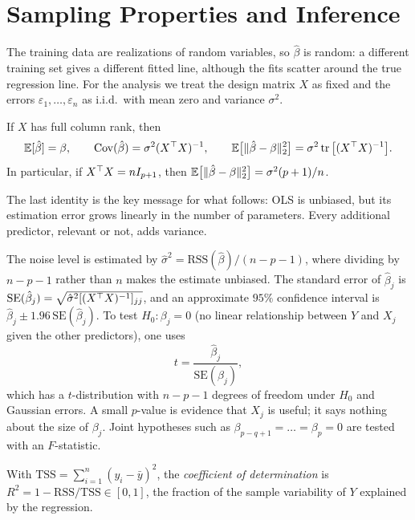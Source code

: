 \section{Sampling Properties and Inference}\label{sec:ols-inference}

The training data are realizations of random variables, so $\hat\beta$ is random: a different training set gives a different fitted line, although the fits scatter around the true regression line. For the analysis we treat the design matrix $X$ as fixed and the errors $\varepsilon_1,\dots,\varepsilon_n$ as i.i.d.\ with mean zero and variance $\sigma^2$.

\begin{proposition}\label{prop:ols-moments}
If $X$ has full column rank, then
\[
\mathbb{E}[\hat\beta]=\beta,\qquad \operatorname{Cov}(\hat\beta)=\sigma^2(X^{\top} X)^{-1},\qquad \mathbb{E}\big[\lVert \hat\beta-\beta\rVert_2^2\big]=\sigma^2\operatorname{tr}\big[(X^{\top} X)^{-1}\big].
\]
In particular, if $X^{\top} X=nI_{p+1}$, then $\mathbb{E}\big[\lVert \hat\beta-\beta\rVert_2^2\big]=\sigma^2(p+1)/n$.
\end{proposition}

The last identity is the key message for what follows: OLS is unbiased, but its estimation error grows linearly in the number of parameters. Every additional predictor, relevant or not, adds variance.

The noise level is estimated by $\hat\sigma^2=\mathrm{RSS}(\hat\beta)/(n-p-1)$, where dividing by $n-p-1$ rather than $n$ makes the estimate unbiased. The standard error of $\hat\beta_j$ is $\mathrm{SE}(\hat\beta_j)=\sqrt{\hat\sigma^2[(X^{\top} X)^{-1}]_{jj}}$, and an approximate $95\%$ confidence interval is $\hat\beta_j\pm1.96\,\mathrm{SE}(\hat\beta_j)$. To test $H_0\colon\beta_j=0$ (no linear relationship between $Y$ and $X_j$ given the other predictors), one uses
\[
t=\frac{\hat\beta_j}{\mathrm{SE}(\hat\beta_j)},
\]
which has a $t$-distribution with $n-p-1$ degrees of freedom under $H_0$ and Gaussian errors. A small $p$-value is evidence that $X_j$ is useful; it says nothing about the size of $\beta_j$. Joint hypotheses such as $\beta_{p-q+1}=\dots=\beta_p=0$ are tested with an $F$-statistic.

\begin{definition}\label{def:r2}
With $\mathrm{TSS}=\sum_{i=1}^n(y_i-\bar y)^2$, the \emph{coefficient of determination} is $R^2=1-\mathrm{RSS}/\mathrm{TSS}\in[0,1]$, the fraction of the sample variability of $Y$ explained by the regression.
\end{definition}

